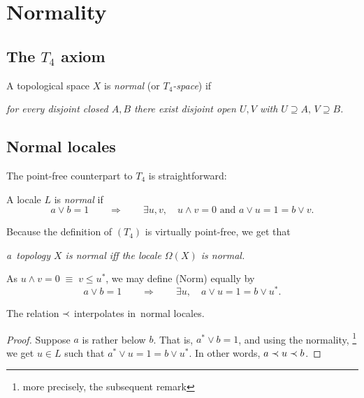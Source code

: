 \chapter{Normality}

\section{The $T_4$ axiom}

\begin{framed}
  \begin{df}[$T_4$]
    A topological space $X$ is \emph{normal\/} (or \emph{$T_4$-space\/}) if
    \begin{center} \it
      for every disjoint closed $A, B$ there exist disjoint open $U, V$ with
      $U\supseteq A, \, V\supseteq B$.
    \end{center}
  \end{df}
\end{framed}

\section{Normal locales}

The point-free counterpart to $T_4$ is straightforward:

\begin{framed}
  \begin{df}[Norm]
    A locale $L$ is \emph{normal\/} if
    \[
      a \vee b = 1 \qquad \Rightarrow \qquad \exists u, v, \quad u \wedge v =
      0 \text{ and } a \vee u = 1 = b \vee v.
    \]
  \end{df}
\end{framed}

Because the definition of $(T_4)$ is virtually point-free, we get that
\begin{center}
  \emph{a~topology $X$ is normal iff the locale $\Omega(X)$ is normal.\/}
\end{center}

\begin{rem}
  As $u \wedge v = 0 \; \equiv \; v \le u^*$, we may define (Norm) equally by
  \[
    a \vee b = 1 \qquad \Rightarrow \qquad \exists u, \quad a \vee u = 1 = b
    \vee u^*.
  \]
\end{rem}

\begin{lem}
  The relation $\prec$ interpolates in~normal locales.
\end{lem}
\begin{proof}
  Suppose $a$ is rather below $b$.
  That is, $a^* \vee b = 1$, and using the normality,\thinspace%
  \footnote{more precisely, the subsequent remark}
  we get $u\in L$ such that
  $a^* \vee u = 1 = b \vee u^*$.
  In other words, $a \prec u \prec b$.
\end{proof}


